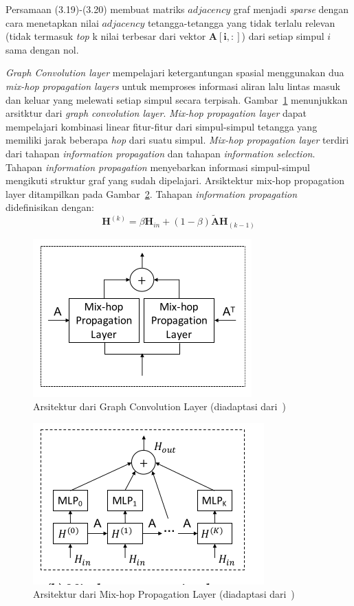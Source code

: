 Persamaan (3.19)-(3.20) membuat matriks $adjacency$ graf menjadi \textit{sparse} dengan cara menetapkan nilai $adjacency$ tetangga-tetangga yang tidak terlalu relevan (tidak termasuk \textit{top} k nilai terbesar dari vektor $\mathbf{A[i,:]}$) dari setiap simpul $i$ sama dengan nol.

\textit{Graph Convolution layer} mempelajari ketergantungan spasial menggunakan dua \textit{mix-hop }\textit{propagation layers} untuk memproses informasi aliran lalu lintas masuk dan keluar yang melewati setiap simpul secara terpisah. Gambar~\ref{fig:gc-layer} menunjukkan arsitktur dari \textit{graph convolution layer}. \textit{Mix-hop propagation layer} dapat mempelajari kombinasi linear fitur-fitur dari simpul-simpul tetangga yang memiliki jarak beberapa \textit{hop} dari suatu simpul. \textit{Mix-hop propagation layer} terdiri dari tahapan \textit{information propagation} dan tahapan \textit{information selection}. Tahapan \textit{information propagation} menyebarkan informasi simpul-simpul mengikuti struktur graf yang sudah dipelajari. Arsiktektur mix-hop propagation layer ditampilkan pada Gambar~\ref{fig:mixhop-layer}. Tahapan \textit{information propagation} didefinisikan dengan:
\begin{equation}
    \mathbf{H}^{(k)}=\beta \mathbf{H}_{in}+(1-\beta ) \tilde{\mathbf{A}} \mathbf{H}_{(k-1)}
\end{equation}


\begin{figure}[H]
    \centering
    \includegraphics[]{figures/gc_layer.png}
    \caption{Arsitektur dari Graph Convolution Layer (diadaptasi dari~\cite{Wu2020})}
    \label{fig:gc-layer}
\end{figure}



\begin{figure}[H]
    \centering
    \includegraphics[]{figures/mix_hop.png}
    \caption{Arsitektur dari Mix-hop Propagation Layer (diadaptasi dari~\cite{Wu2020})}
    \label{fig:mixhop-layer}
\end{figure}


